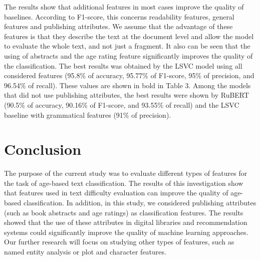 \documentclass[runningheads]{llncs}
\begin{document}
The results show that additional features in most cases improve the quality of baselines. According to F1-score, this concerns readability features, general features and publishing attributes. We assume that the advantage of these features is that they describe the text at the document level and allow the model to evaluate the whole text, and not just a fragment. It also can be seen that the using of abstracts and the age rating feature significantly improves the quality of the classification. The best results was obtained by the LSVC model using all considered features (95.8\% of accuracy, 95.77\% of F1-score, 95\% of precision, and 96.54\% of recall). These values are shown in bold in Table 3. Among the models that did not use publishing attributes, the best results were shown by RuBERT (90.5\% of accuracy, 90.16\% of F1-score, and 93.55\% of recall) and the LSVC baseline with grammatical features (91\% of precision).

\section{Conclusion}

The purpose of the current study was to evaluate different types of features for the task of age-based text classification. The results of this investigation show that features used in text difficulty evaluation can improve the quality of age-based classification. In addition, in this study, we considered publishing attributes (such as book abstracts and age ratings) as classification features. The results showed that the use of these attributes in digital libraries and recommendation systems could significantly improve the quality of machine learning approaches. Our further research will focus on studying other types of features, such as named entity analysis or plot and character features.
\end{document}
